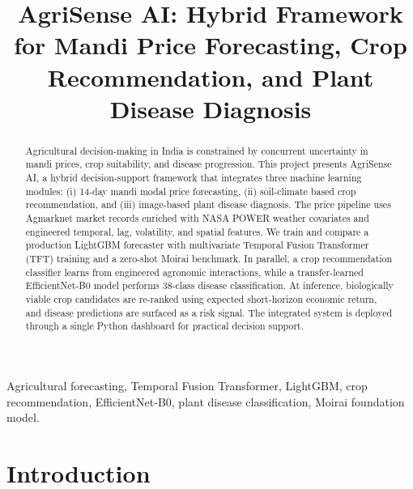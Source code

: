 \documentclass[conference]{IEEEtran}
\begin{document}
\title{AgriSense AI: Hybrid Framework for Mandi Price Forecasting, Crop Recommendation, and Plant Disease Diagnosis}

\author{
\and
{}
}

\maketitle

\begin{abstract}
Agricultural decision-making in India is constrained by concurrent uncertainty in mandi prices, crop suitability, and disease progression. This project presents AgriSense AI, a hybrid decision-support framework that integrates three machine learning modules: (i) 14-day mandi modal price forecasting, (ii) soil-climate based crop recommendation, and (iii) image-based plant disease diagnosis. The price pipeline uses Agmarknet market records enriched with NASA POWER weather covariates and engineered temporal, lag, volatility, and spatial features. We train and compare a production LightGBM forecaster with multivariate Temporal Fusion Transformer (TFT) training and a zero-shot Moirai benchmark. In parallel, a crop recommendation classifier learns from engineered agronomic interactions, while a transfer-learned EfficientNet-B0 model performs 38-class disease classification. At inference, biologically viable crop candidates are re-ranked using expected short-horizon economic return, and disease predictions are surfaced as a risk signal. The integrated system is deployed through a single Python dashboard for practical decision support.
\end{abstract}

\begin{IEEEkeywords}
Agricultural forecasting, Temporal Fusion Transformer, LightGBM, crop recommendation, EfficientNet-B0, plant disease classification, Moirai foundation model.
\end{IEEEkeywords}

\section{Introduction}
\end{document}
